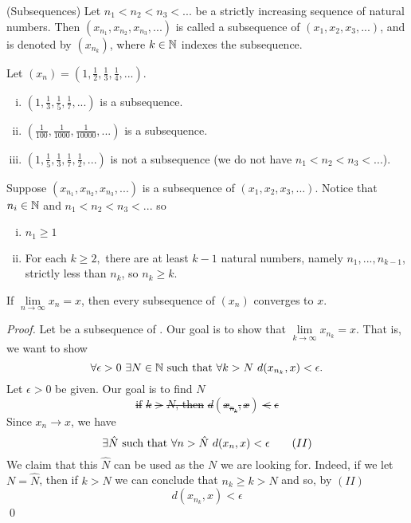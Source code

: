 \begin{definition} (Subsequences)
    \routineSeq Let $n_1 < n_2 < n_3 < ...$ be a strictly increasing sequence of natural numbers. Then $(x_{n_1}, x_{n_2}, x_{n_3},...)$ is called a subsequence of $(x_1, x_2, x_3,...)$, and is denoted by $(x_{n_k})$, where $k \in \mathbb{N}$ indexes the subsequence.
\end{definition}

\begin{example}
    Let $(x_n) = (1, \frac{1}{2}, \frac{1}{3}, \frac{1}{4},...)$.
    \begin{enumerate}[(i)]
        \item $(1, \frac{1}{3}, \frac{1}{5}, \frac{1}{7},...)$ is a subsequence.
        \item $(\frac{1}{100}, \frac{1}{1000}, \frac{1}{10000},...)$ is a subsequence.
        \item $(1, \frac{1}{5}, \frac{1}{3}, \frac{1}{7}, \frac{1}{2},...)$ is not a subsequence (we do not have $n_1 < n_2 < n_3 <...$).
    \end{enumerate}
\end{example}
\begin{remark}
    Suppose $(x_{n_1}, x_{n_2}, x_{n_3},...)$ is a subsequence of $(x_1, x_2, x_3, ...)$. Notice that $n_i \in \mathbb{N}$ and $n_1 < n_2 < n_3 < ...$ so
    \begin{enumerate}[(i)]
        \item $n_1 \geq 1$
        \item For each $k \geq 2,$ there are at least $k-1$ natural numbers, namely $n_1,...,n_{k-1}$, strictly less than $n_k$, so $n_k \geq k$.
    \end{enumerate}
\end{remark}

\begin{theorem}
    \routineSeq If $\lim \limits_{n \to \infty} x_n = x$, then every subsequence of $(x_n)$ converges to $x$.
\end{theorem}
\begin{proof}
    Let  be a subsequence of . Our goal is to show that $\lim \limits_{k \to \infty} x_{n_k} = x.$ That is, we want to show
    $$\forall \epsilon > 0 ~\exists N \in \mathbb{N} \text{ such that } \forall k > N ~d(x_{n_k}, x) < \epsilon.$$
    Let $\epsilon > 0$ be given. Our goal is to find $N$ \st
    \begin{equation}
        \text{if $k > N$, then $d(x_{n_k}, x) < \epsilon$}
        \tag{$I$}
    \end{equation}
    Since $x_n \to x$, we have
    \begin{equation}
        \exists \hat{N} \text{ such that } \forall n > \hat{N} ~d(x_n, x) < \epsilon
        \tag{$II$}
    \end{equation}
    We claim that this $\hat{N}$ can be used as the $N$ we are looking for. Indeed, if we let $N=\hat{N}$, then if $k > N$ we can conclude that $n_k \geq k > N$ and so, by $(II)$
    $$d(x_{n_k},x) < \epsilon$$ \qed
\end{proof}

